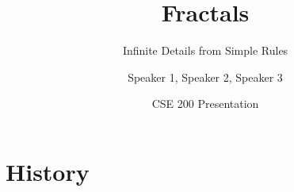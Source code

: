 

\title{Fractals}
\subtitle{Infinite Details from Simple Rules}
\author{Speaker 1, Speaker 2, Speaker 3}   %
\date{CSE 200 Presentation}

\newcommand{\takeaway}[1]{%
  \begin{tcolorbox}[colback=PrimaryColor!8, colframe=PrimaryColor, arc=2mm,
    boxrule=0.8pt, left=6pt, right=6pt, top=3pt, bottom=3pt]
    \small #1
  \end{tcolorbox}}
\newcommand{\source}[1]{{\scriptsize\color{DarkGray}#1}}




\begin{frame}
  \titlepage
\end{frame}

\section{History}

